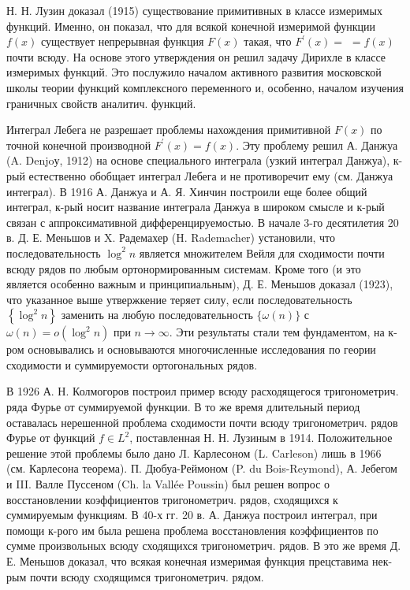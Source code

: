 \documentclass[10pt]{article}
\begin{document}
Н. Н. Лузин доказал (1915) существование примитивных в классе измеримых функций. Именно, он показал, что для всякой конечной измеримой функции $f(x)$ существует непрерывная функция $F(x)$ такая, что $F^{\prime}(x)=$ $=f(x)$ почти всюду. На основе этого утверждения он решил задачу Дирихле в классе измеримых функций. Это послужило началом активного развития московской школы теории функций комплексного переменного и, особенно, началом изучения граничных свойств аналитич. функций.



Интеграл Лебега не разрешает проблемы нахождения примитивной $F(x)$ по точной конечной производной $F^{\prime}(x)=f(x)$. Эту проблему решил А. Данжуа (A. Denjoу, 1912) на основе специального интеграла (узкий интеграл Данжуа), к-рый естественно обобщает интеграл Лебега и не противоречит ему (см. Данжуа интеграл). В 1916 А. Данжуа и А. Я. Хинчин построили еще более общий интеграл, к-рый носит название интеграла Данжуа в широком смысле и к-рый связан с аппроксимативной дифференцируемостью. В начале 3-го десятилетия 20 в. Д. Е. Меньшов и X. Радемахер (H. Rademacher) установили, что последовательность $\log ^{2} n$ является множителем Вейля для сходимости почти всюду рядов по любым ортонормированным системам. Кроме того (и это является особенно важным и принципиальным), Д. Е. Меньшов доказал (1923), что указанное выше утвержкение теряет силу, если последовательность $\left\{\log ^{2} n\right\}$ заменить на любую последовательность $\{\omega(n)\}$ с $\omega(n)=o\left(\log ^{2} n\right)$ при $n \rightarrow \infty$. Эти результаты стали тем фундаментом, на к-ром основывались и основываются многочисленные исследования по геории сходимости и суммируемости ортогональных рядов.



В 1926 А. Н. Колмогоров построил пример всюду расходящегося тригонометрич. ряда Фурье от суммируемой функции. В то же время длительный период оставалась нерешенной проблема сходимости почти всюду тригонометрич. рядов Фурье от функций $f \in L^{2}$, поставленная Н. Н. Лузиным в 1914. Положительное решение этой проблемы было дано Л. Карлесоном (L. Carleson) лишь в 1966 (см. Карлесона теорема). П. Дюбуа-Реймоном (P. du Bois-Reymond), А. Јебегом и III. Валле Пуссеном (Ch. la Vallée Poussin) был решен вопрос о восстановлении коэффициентов тригонометрич. рядов, сходящихся к суммируемым функциям. В 40-х гг. 20 в. А. Данжуа построил интеграл, при помощи к-рого им была решена проблема восстановления коэффициентов по сумме произвольных всюду сходящихся тригонометрич. рядов. В это же время Д. Е. Меньшов доказал, что всякая конечная измеримая функция прецставима нек-рым почти всюду сходящимся тригонометрич. рядом.
\end{document}
